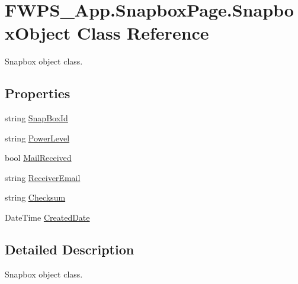 \hypertarget{class_f_w_p_s___app_1_1_snapbox_page_1_1_snapbox_object}{}\section{F\+W\+P\+S\+\_\+\+App.\+Snapbox\+Page.\+Snapbox\+Object Class Reference}
\label{class_f_w_p_s___app_1_1_snapbox_page_1_1_snapbox_object}


Snapbox object class.  


\subsection*{Properties}
\begin{DoxyCompactItemize}
\item 
string \mbox{\hyperlink{class_f_w_p_s___app_1_1_snapbox_page_1_1_snapbox_object_ae0b7c5f85820765cd812159c904f7fb1}{Snap\+Box\+Id}}
\item 
string \mbox{\hyperlink{class_f_w_p_s___app_1_1_snapbox_page_1_1_snapbox_object_af2a8109114a60a7f1340c00073402f24}{Power\+Level}}
\item 
bool \mbox{\hyperlink{class_f_w_p_s___app_1_1_snapbox_page_1_1_snapbox_object_ab6af9de409452565499941bf81356399}{Mail\+Received}}
\item 
string \mbox{\hyperlink{class_f_w_p_s___app_1_1_snapbox_page_1_1_snapbox_object_a70a40df86d141455d1cadb4e0d98c9f8}{Receiver\+Email}}
\item 
string \mbox{\hyperlink{class_f_w_p_s___app_1_1_snapbox_page_1_1_snapbox_object_a9d88ebd6cbf8c68f1161a96f4582f0c7}{Checksum}}
\item 
Date\+Time \mbox{\hyperlink{class_f_w_p_s___app_1_1_snapbox_page_1_1_snapbox_object_a2def45f30989b6124bef8ad1e5f533fa}{Created\+Date}}
\end{DoxyCompactItemize}


\subsection{Detailed Description}
Snapbox object class. 


